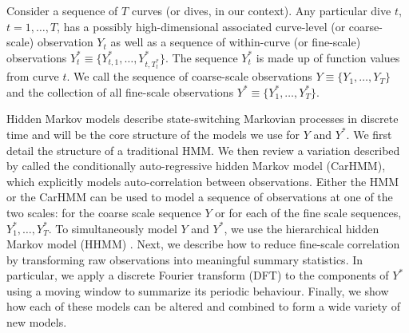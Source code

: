 
Consider a sequence of $T$ curves (or dives, in our context). Any particular dive $t$, $t = 1,
\ldots,T$, has a possibly high-dimensional associated curve-level (or coarse-scale) observation $Y_t$ as well as a sequence of within-curve (or fine-scale) observations $Y^*_{t} \equiv \Big\{Y^*_{t,1},\ldots,Y^*_{t,T^*_t}\Big\}$. The sequence $Y^*_{t}$ is made up of function values from curve $t$. We call the sequence of coarse-scale observations $Y \equiv \Big\{Y_1, \ldots, Y_T\Big\}$ and the collection of all fine-scale observations $Y^* \equiv \Big\{Y^*_1,\ldots,Y^*_T \Big\}$.

Hidden Markov models describe state-switching Markovian processes in discrete time and will be the core structure of the models we use for $Y$ and $Y^*$. %
We first detail the structure of a traditional HMM. We then review a variation described by \cite{Lawler:2019} called the conditionally auto-regressive hidden Markov model (CarHMM), which explicitly models auto-correlation between observations. Either the HMM or the CarHMM can be used to model a sequence of observations at one of the two scales: for the coarse scale sequence $Y$ or for each of the fine scale sequences, $Y_1^*,\ldots, Y_T^*$. To simultaneously model $Y$ and $Y^*$, we use the hierarchical hidden Markov model (HHMM) \citep{Barajas:2017,Adam:2019}.
Next, we describe how to reduce fine-scale correlation by transforming raw observations into meaningful summary statistics. In particular, we apply a discrete Fourier transform (DFT) to the components of $Y^*$ using a moving window to summarize its periodic behaviour. Finally, we show how each of these models can be altered and combined to form a wide variety of new models.

